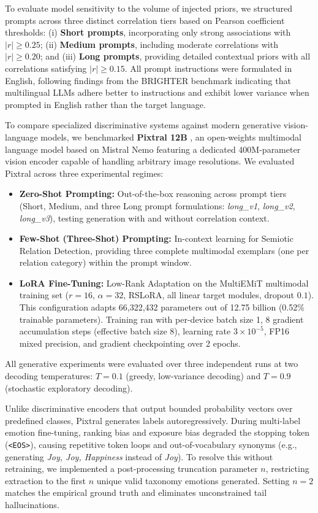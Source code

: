 To evaluate model sensitivity to the volume of injected priors, we structured prompts across three distinct correlation tiers based on Pearson coefficient thresholds: (i) \textbf{Short prompts}, incorporating only strong associations with $|r| \ge 0.25$; (ii) \textbf{Medium prompts}, including moderate correlations with $|r| \ge 0.20$; and (iii) \textbf{Long prompts}, providing detailed contextual priors with all correlations satisfying $|r| \ge 0.15$. All prompt instructions were formulated in English, following findings from the BRIGHTER benchmark \cite{brighter_project} indicating that multilingual LLMs adhere better to instructions and exhibit lower variance when prompted in English rather than the target language.

To compare specialized discriminative systems against modern generative vision-language models, we benchmarked \textbf{Pixtral 12B} \cite{pixtral}, an open-weights multimodal language model based on Mistral Nemo featuring a dedicated 400M-parameter vision encoder capable of handling arbitrary image resolutions.
We evaluated Pixtral across three experimental regimes:
\begin{itemize}\setlength{\itemsep}{1pt}\setlength{\parskip}{0pt}\setlength{\topsep}{2pt}
    \item \textbf{Zero-Shot Prompting:} Out-of-the-box reasoning across prompt tiers (Short, Medium, and three Long prompt formulations: \textit{long\_v1}, \textit{long\_v2}, \textit{long\_v3}), testing generation with and without correlation context.
    \item \textbf{Few-Shot (Three-Shot) Prompting:} In-context learning for Semiotic Relation Detection, providing three complete multimodal exemplars (one per relation category) within the prompt window.
    \item \textbf{LoRA Fine-Tuning:} Low-Rank Adaptation on the MultiEMiT multimodal training set ($r=16$, $\alpha=32$, RSLoRA, all linear target modules, dropout $0.1$). This configuration adapts 66,322,432 parameters out of 12.75 billion (0.52\% trainable parameters). Training ran with per-device batch size 1, 8 gradient accumulation steps (effective batch size 8), learning rate $3 \times 10^{-5}$, FP16 mixed precision, and gradient checkpointing over 2 epochs.
\end{itemize}

All generative experiments were evaluated over three independent runs at two decoding temperatures: $T=0.1$ (greedy, low-variance decoding) and $T=0.9$ (stochastic exploratory decoding).

Unlike discriminative encoders that output bounded probability vectors over predefined classes, Pixtral generates labels autoregressively. During multi-label emotion fine-tuning, ranking bias and exposure bias degraded the stopping token (\texttt{<EOS>}), causing repetitive token loops and out-of-vocabulary synonyms (e.g., generating \textit{Joy, Joy, Happiness} instead of \textit{Joy}). To resolve this without retraining, we implemented a post-processing truncation parameter $n$, restricting extraction to the first $n$ unique valid taxonomy emotions generated. Setting $n=2$ matches the empirical ground truth and eliminates unconstrained tail hallucinations.
